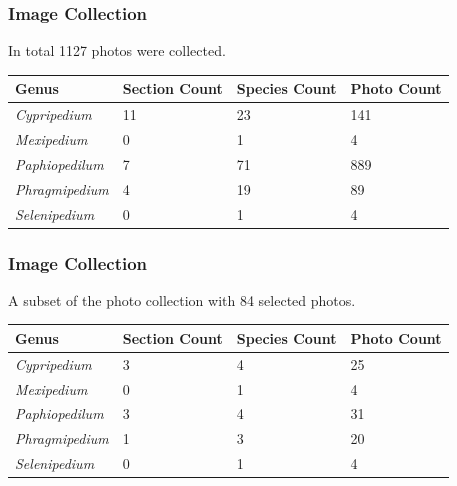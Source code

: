 \documentclass[]{beamer}
\begin{document}
    \begin{frame}[plain]
        \frametitle{Image Collection}

        In total 1127 photos were collected.

        \begin{table}[h]\scriptsize
            \begin{center}
            \begin{tabular}{llll}
            \toprule
            \textbf{Genus} & \textbf{Section Count} & \textbf{Species Count} & \textbf{Photo Count} \\
            \midrule
            \textit{Cypripedium} & 11 & 23 & 141 \\
            \textit{Mexipedium} & 0 & 1 & 4 \\
            \textit{Paphiopedilum} & 7 & 71 & 889 \\
            \textit{Phragmipedium} & 4 & 19 & 89 \\
            \textit{Selenipedium} & 0 & 1 & 4 \\
            \bottomrule
            \end{tabular}
            \end{center}
        \end{table}
    \end{frame}

    \begin{frame}[plain]
        \frametitle{Image Collection}

        A subset of the photo collection with 84 selected photos.

        \begin{table}[h]\scriptsize
            \begin{center}
            \begin{tabular}{llll}
            \toprule
            \textbf{Genus} & \textbf{Section Count} & \textbf{Species Count} & \textbf{Photo Count} \\
            \midrule
            \textit{Cypripedium} & 3 & 4 & 25 \\
            \textit{Mexipedium} & 0 & 1 & 4 \\
            \textit{Paphiopedilum} & 3 & 4 & 31 \\
            \textit{Phragmipedium} & 1 & 3 & 20 \\
            \textit{Selenipedium} & 0 & 1 & 4 \\
            \bottomrule
            \end{tabular}
            \end{center}
        \end{table}
    \end{frame}
\end{document}
